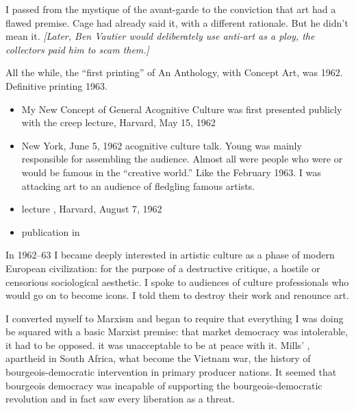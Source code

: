 I passed from the mystique of the avant-garde to the conviction that art had a flawed premise.  Cage had already said it, with a different rationale.  But he didn't mean it.  {\itshape \footnotesize [Later, Ben Vautier would deliberately use anti-art as a ploy, the collectors paid him to scam them.]}

\Pb 
 
All the while, the \enquote{first printing} of An Anthology, with Concept Art, was 1962.  Definitive printing 1963.

\Pb 
 
\begin{itemize}
\item My New Concept of General Acognitive Culture was first presented publicly with the creep lecture, Harvard, May 15, 1962

\item New York, June 5, 1962  acognitive culture talk.  Young was mainly responsible for assembling the audience.  Almost all were people who were or would be famous in the \enquote{creative world.}  Like the February 1963.  I was attacking art to an audience of fledgling famous artists.

\item lecture , Harvard, August 7, 1962

\item publication in 
\end{itemize}


In 1962--63 I became deeply interested in artistic culture as a phase of modern European civilization:  for the purpose of a destructive critique, a hostile or censorious sociological aesthetic.  I spoke to audiences of culture professionals who would go on to become icons.  I told them to destroy their work and renounce art. 

I converted myself to Marxism and began to require that everything I was doing be squared with a basic Marxist premise:  that market democracy was intolerable, it had to be opposed.  it was unacceptable to be at peace with it.  Mills' , apartheid in South Africa, what become the Vietnam war, the history of bourgeois-democratic intervention in primary producer nations.  It seemed that bourgeois democracy was incapable of supporting the bourgeois-democratic revolution and in fact saw every liberation as a threat.


